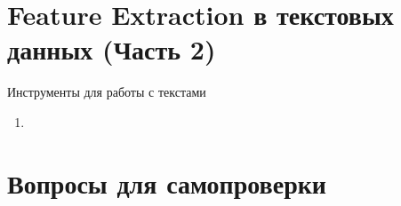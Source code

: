 \section{Feature Extraction в текстовых данных (Часть 2)}\label{section:texts_fe2}


\begin{frame}{Инструменты для работы с текстами}
	\begin{enumerate}
		\item
	\end{enumerate}

\end{frame}


\section{Вопросы для самопроверки}

